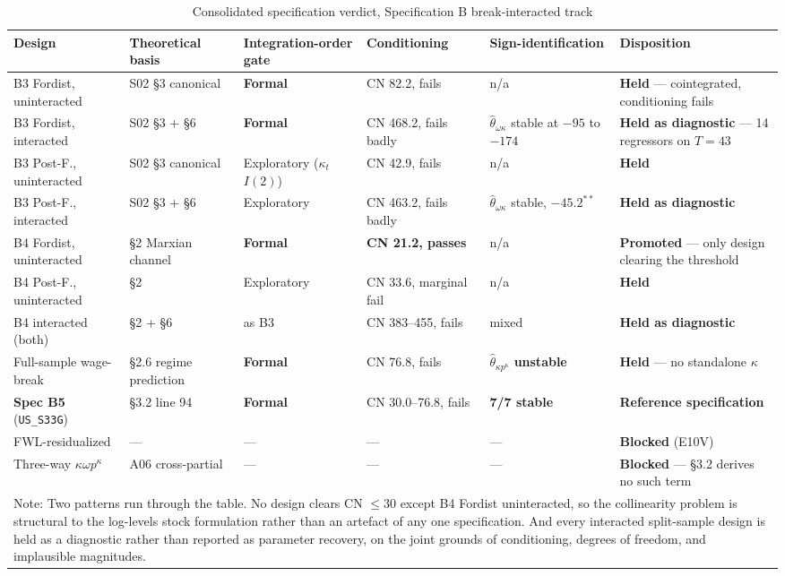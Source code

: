\documentclass[11pt,a4paper]{article}
\begin{document}
\begin{landscape}
\begin{table}[H]
\centering
\caption{Consolidated specification verdict, Specification B break-interacted track}
\label{tab:specB_verdict}
\footnotesize
\begin{tabular}{p{3.6cm}p{3.2cm}p{3.4cm}p{2.6cm}p{3.6cm}p{4.4cm}}
\toprule
Design & Theoretical basis & Integration-order gate & Conditioning & Sign-identification & Disposition \\
\midrule
B3 Fordist, uninteracted & S02 \S3 canonical & \textbf{Formal} & CN 82.2, fails & n/a & \textbf{Held} --- cointegrated, conditioning fails \\
B3 Fordist, interacted & S02 \S3 + \S6 & \textbf{Formal} & CN 468.2, fails badly & $\hat{\theta}_{\omega\kappa}$ stable at $-95$ to $-174$ & \textbf{Held as diagnostic} --- 14 regressors on $T=43$ \\
B3 Post-F., uninteracted & S02 \S3 canonical & Exploratory ($\kappa_t$ $I(2)$) & CN 42.9, fails & n/a & \textbf{Held} \\
B3 Post-F., interacted & S02 \S3 + \S6 & Exploratory & CN 463.2, fails badly & $\hat{\theta}_{\omega\kappa}$ stable, $-45.2^{**}$ & \textbf{Held as diagnostic} \\
B4 Fordist, uninteracted & \S2 Marxian channel & \textbf{Formal} & \textbf{CN 21.2, passes} & n/a & \textbf{Promoted} --- only design clearing the threshold \\
B4 Post-F., uninteracted & \S2 & Exploratory & CN 33.6, marginal fail & n/a & \textbf{Held} \\
B4 interacted (both) & \S2 + \S6 & as B3 & CN 383--455, fails & mixed & \textbf{Held as diagnostic} \\
Full-sample wage-break & \S2.6 regime prediction & \textbf{Formal} & CN 76.8, fails & $\hat{\theta}_{\kappa p^{\kappa}}$ \textbf{unstable} & \textbf{Held} --- no standalone $\kappa$ \\
\textbf{Spec B5} (\texttt{US\_S33G}) & \S3.2 line 94 & \textbf{Formal} & CN 30.0--76.8, fails & \textbf{7/7 stable} & \textbf{Reference specification} \\
FWL-residualized & --- & --- & --- & --- & \textbf{Blocked} (E10V) \\
Three-way $\kappa\omega p^{\kappa}$ & A06 cross-partial & --- & --- & --- & \textbf{Blocked} --- \S3.2 derives no such term \\
\bottomrule
\multicolumn{6}{p{22.5cm}}{\footnotesize Note: Two patterns run through the table. No design clears CN $\le 30$ except B4 Fordist uninteracted, so the collinearity problem is structural to the log-levels stock formulation rather than an artefact of any one specification. And every interacted split-sample design is held as a diagnostic rather than reported as parameter recovery, on the joint grounds of conditioning, degrees of freedom, and implausible magnitudes.}
\end{tabular}
\end{table}
\end{landscape}
\end{document}
